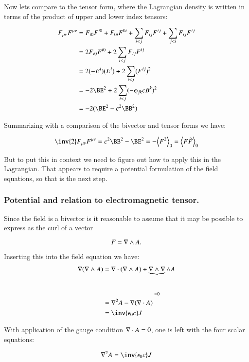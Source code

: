 Now lets compare to the tensor form, where the Lagrangian density is written in terms of the product of upper and lower index tensors:

\begin{align*}
F_{\mu\nu}F^{\mu\nu}
&= F_{i 0}F^{i 0} +F_{0 i}F^{0 i} +\sum_{i<j} F_{i j}F^{i j} +\sum_{j<i} F_{i j}F^{i j} \\
&= 2 F_{i 0}F^{i 0} + 2 \sum_{i<j} F_{i j}F^{i j} \\
&= 2 (-E^i)(E^i) + 2 \sum_{i<j} (F^{i j})^2 \\
&= -2 \BE^2 + 2 \sum_{i<j} ( -\epsilon_{ijk} c B^k )^2 \\
&= -2 ( \BE^2 - c^2 \BB^2 )
\end{align*}

Summarizing with a comparison of the bivector and tensor forms we have:

\begin{equation}
\inv{2} F_{\mu\nu}F^{\mu\nu} = c^2 \BB^2 - \BE^2 = - \gpgradezero{F^2} = \gpgradezero{ F \tilde{F} }
\end{equation}

But to put this in context we need to figure out how to apply this in the Lagrangian.  That appears to require a potential formulation of the field equations, so that is the next step.

\subsubsection{Potential and relation to electromagnetic tensor. }

Since the field is a bivector is it reasonable to assume that it may be possible to express as the curl of a vector

\begin{equation*}
F = \nabla \wedge A.
\end{equation*}

Inserting this into the field equation we have:
\begin{align*}
\grad (\grad \wedge A)
&= \grad \cdot (\grad \wedge A) + \underbrace{\grad \wedge \grad}_{=0} \wedge A \\
&= \grad^2 A - \grad ( \grad \cdot A ) \\
&= \inv{\epsilon_0 c} J
\end{align*}

With application of the gauge condition $\nabla \cdot A = 0$, one is left with the four scalar equations:

\begin{equation}\label{eqn:maxToTensor:potential}
\grad^2 A = \inv{\epsilon_0 c} J
\end{equation}

